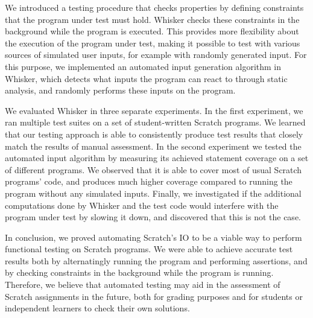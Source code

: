 We introduced a testing procedure that checks properties by defining constraints that the program under test must hold.
Whisker checks these constraints in the background while the program is executed.
This provides more flexibility about the execution of the program under test,
making it possible to test with various sources of simulated user inputs, for example with randomly generated input.
For this purpose, we implemented an automated input generation algorithm in Whisker,
which detects what inputs the program can react to through static analysis, and randomly performs these inputs on the program.
\parspace

We evaluated Whisker in three separate experiments.
In the first experiment, we ran multiple test suites on a set of student-written Scratch programs.
We learned that our testing approach is able to consistently produce test results that closely match the results of manual assessment.
In the second experiment we tested the automated input algorithm by measuring its achieved statement coverage
on a set of different programs.
We observed that it is able to cover most of usual Scratch programs' code,
and produces much higher coverage compared to running the program without any simulated inputs.
Finally, we investigated if the additional computations done by Whisker and the test code would interfere with the program under test
by slowing it down, and discovered that this is not the case.
\parspace


In conclusion, we proved automating Scratch's IO to be a viable way to perform functional testing on Scratch programs.
We were able to achieve accurate test results both by alternatingly running the program and performing assertions, and by checking constraints in the background while the program is running.
Therefore, we believe that automated testing may aid in the assessment of Scratch assignments in the future,
both for grading purposes and for students or independent learners to check their own solutions.
